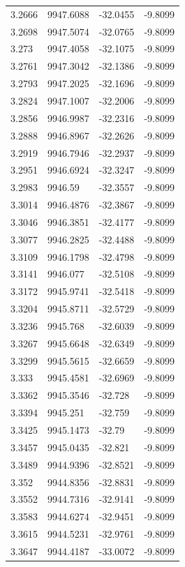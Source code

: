 \begin{table}[H]
\begin{tabular}{llll}
3.2666 & 9947.6088 & -32.0455 & -9.8099 \\
3.2698 & 9947.5074 & -32.0765 & -9.8099 \\
3.273 & 9947.4058 & -32.1075 & -9.8099 \\
3.2761 & 9947.3042 & -32.1386 & -9.8099 \\
3.2793 & 9947.2025 & -32.1696 & -9.8099 \\
3.2824 & 9947.1007 & -32.2006 & -9.8099 \\
3.2856 & 9946.9987 & -32.2316 & -9.8099 \\
3.2888 & 9946.8967 & -32.2626 & -9.8099 \\
3.2919 & 9946.7946 & -32.2937 & -9.8099 \\
3.2951 & 9946.6924 & -32.3247 & -9.8099 \\
3.2983 & 9946.59 & -32.3557 & -9.8099 \\
3.3014 & 9946.4876 & -32.3867 & -9.8099 \\
3.3046 & 9946.3851 & -32.4177 & -9.8099 \\
3.3077 & 9946.2825 & -32.4488 & -9.8099 \\
3.3109 & 9946.1798 & -32.4798 & -9.8099 \\
3.3141 & 9946.077 & -32.5108 & -9.8099 \\
3.3172 & 9945.9741 & -32.5418 & -9.8099 \\
3.3204 & 9945.8711 & -32.5729 & -9.8099 \\
3.3236 & 9945.768 & -32.6039 & -9.8099 \\
3.3267 & 9945.6648 & -32.6349 & -9.8099 \\
3.3299 & 9945.5615 & -32.6659 & -9.8099 \\
3.333 & 9945.4581 & -32.6969 & -9.8099 \\
3.3362 & 9945.3546 & -32.728 & -9.8099 \\
3.3394 & 9945.251 & -32.759 & -9.8099 \\
3.3425 & 9945.1473 & -32.79 & -9.8099 \\
3.3457 & 9945.0435 & -32.821 & -9.8099 \\
3.3489 & 9944.9396 & -32.8521 & -9.8099 \\
3.352 & 9944.8356 & -32.8831 & -9.8099 \\
3.3552 & 9944.7316 & -32.9141 & -9.8099 \\
3.3583 & 9944.6274 & -32.9451 & -9.8099 \\
3.3615 & 9944.5231 & -32.9761 & -9.8099 \\
3.3647 & 9944.4187 & -33.0072 & -9.8099 \\

\end{tabular}
\end{table}
